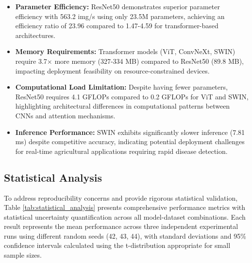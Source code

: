 \documentclass[sn-mathphys]{sn-jnl}
\theoremstyle{thmstyleone}%
\theoremstyle{thmstyletwo}%
\theoremstyle{thmstylethree}%
\begin{document}
\begin{itemize}
     \item[--] \textbf{Parameter Efficiency:} ResNet50 demonstrates superior parameter efficiency with 563.2 img/s using only 23.5M parameters, achieving an efficiency ratio of 23.96 compared to 1.47-4.59 for transformer-based architectures.
    
    \item[--] \textbf{Memory Requirements:} Transformer models (ViT, ConvNeXt, SWIN) require 3.7× more memory (327-334 MB) compared to ResNet50 (89.8 MB), impacting deployment feasibility on resource-constrained devices.
    
    \item[--] \textbf{Computational Load Limitation:} Despite having fewer parameters, ResNet50 requires 4.1 GFLOPs compared to 0.2 GFLOPs for ViT and SWIN, highlighting architectural differences in computational patterns between CNNs and attention mechanisms.
    
    \item[--] \textbf{Inference Performance:} SWIN exhibits significantly slower inference (7.81 ms) despite competitive accuracy, indicating potential deployment challenges for real-time agricultural applications requiring rapid disease detection.
\end{itemize}

\subsection*{Statistical Analysis}

To address reproducibility concerns and provide rigorous statistical validation, Table \ref{tab:statistical_analysis} presents comprehensive performance metrics with statistical uncertainty quantification across all model-dataset combinations. Each result represents the mean performance across three independent experimental runs using different random seeds (42, 43, 44), with standard deviations and 95\% confidence intervals calculated using the t-distribution appropriate for small sample sizes.
\end{document}
